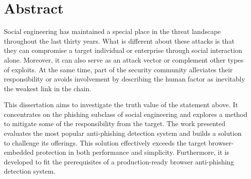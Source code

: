 \chapter*{Abstract}

Social engineering has maintained a special place in the threat landscape throughout the last thirty years. What is different about these attacks is that they can compromise a target individual or enterprise through social interaction alone. Moreover, it can also serve as an attack vector or complement other types of exploits.
At the same time, part of the security community alleviates their responsibility or avoids involvement by describing the human factor as inevitably the weakest link in the chain.

This dissertation aims to investigate the truth value of the statement above. It concentrates on the phishing subclass of social engineering and explores a method to mitigate some of the responsibility from the target. The work presented evaluates the most popular anti-phishing detection system and builds a solution to challenge its offerings. This solution effectively exceeds the target browser-embedded protection in both performance and simplicity. Furthermore, it is developed to fit the prerequisites of a production-ready browser anti-phishing detection system.

